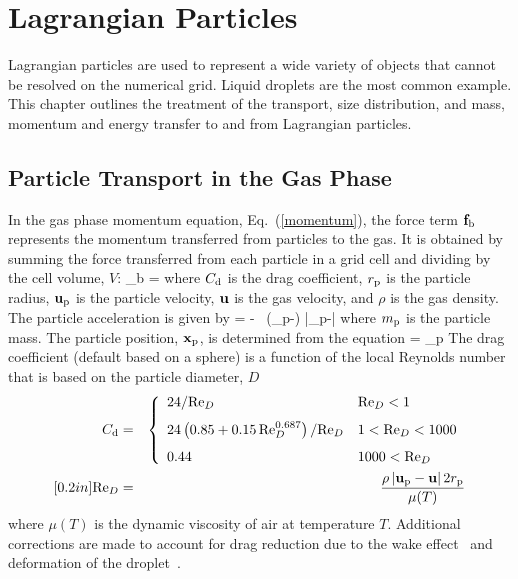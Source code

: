 
\chapter{Lagrangian Particles}
\label{chapter:lagrangian_particles}

Lagrangian particles are used to represent a wide variety of objects that cannot be resolved on
the numerical grid. Liquid droplets are the most common example. This chapter outlines the treatment of the transport, size
distribution, and mass, momentum and energy transfer to and from Lagrangian particles.

\section{Particle Transport in the Gas Phase}

In the gas phase momentum equation, Eq.~(\ref{momentum}), the force term ${\bf f}_{\rm b}$ represents the momentum transferred from particles to the gas.
It is obtained by summing the force transferred from each particle
in a grid cell and dividing by the cell volume, $V$:
\be
    {\bof_{\rm b}} =  \sum {}
\ee
where $C_{\rm d}$ is the drag coefficient, $r_{\rm p}$ is the particle radius, ${\bf u}_{\rm p}$ is the particle velocity, ${\bf u}$ is the
gas velocity, and $\rho$ is the gas density. The particle acceleration is given by
\be
     = \bg - \ha {} \,
    (\bu_{\rm p}-\bu) |\bu_{\rm p}-\bu|
\ee
where $m_{\rm p}$ is the particle mass.  The particle position, ${\bf x}_{\rm p}$, is determined from the equation
\be
     = \bu_{\rm p}
\ee
The drag coefficient (default based on a sphere) is a function of the local Reynolds number that is based on the particle diameter, $D$
\begin{eqnarray}
 C_{\rm d} &=& \left\{ \begin{array}{ll}
     24/\hbox{Re}_D                                          & \hbox{Re}_D < 1    \\ [0.1in]
     24\left(0.85+0.15 \, \hbox{Re}_D^{0.687} \right)/\hbox{Re}_D  & 1 < \hbox{Re}_D < 1000 \\ [0.1in]
     0.44                                              & 1000 < \hbox{Re}_D
     \end{array} \right.  \\ [0.2in]
\hbox{Re}_D &=& \frac{\rho \, |{\bf u}_{\rm p}-{\bf u}| \, 2 r_{\rm p}}{\mu(T)} \end{eqnarray}
where $\mu(T)$ is the dynamic viscosity of air at temperature $T$. Additional corrections are made to account for drag reduction due to the wake effect~\cite{Ramirez:1} and deformation of the droplet~\cite{Loth:1}.


